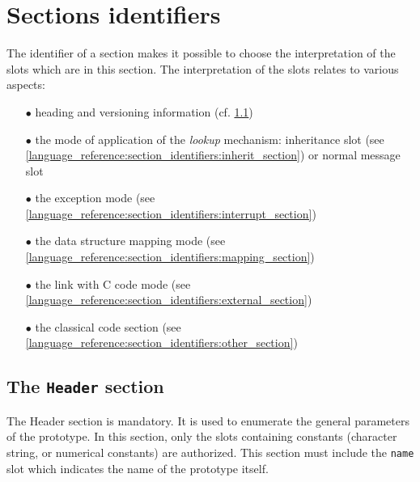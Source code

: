 \documentclass[11pt]{mybook}
\begin{document}
\section{Sections identifiers}
\label{language_reference:section_identifiers}
%
The identifier of a section makes it possible to choose the 
interpretation of the slots which are in this section.
The interpretation of the slots relates to various aspects:
\begin{itemize}

\item[$\bullet$]{heading and versioning information
(cf. \ref{language_reference:section_identifiers:header_section})}

\item[$\bullet$]{the mode of application of the {\it{}lookup} mechanism:
inheritance slot (see \ref{language_reference:section_identifiers:inherit_section}) or normal 
message slot}

\item[$\bullet$]{the exception mode (see \ref{language_reference:section_identifiers:interrupt_section})}

\item[$\bullet$]{the data structure mapping mode (see \ref{language_reference:section_identifiers:mapping_section})}

\item[$\bullet$]{the link with C code mode (see \ref{language_reference:section_identifiers:external_section})}

\item[$\bullet$]{the classical code section (see \ref{language_reference:section_identifiers:other_section})}
\end{itemize}

\subsection{The {\tt{}Header} section }
\label{language_reference:section_identifiers:header_section}
%
The Header section is mandatory.
It is used to enumerate the general parameters of the prototype.
In this section, only the slots containing constants (character string,
or numerical constants) are authorized.
This section must include the {\tt{}name} slot which
indicates the name of the prototype itself.
\end{document}
